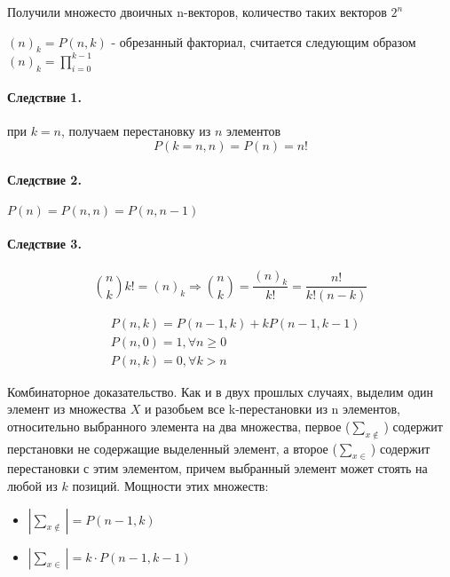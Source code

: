 Получили множесто двоичных n-векторов, количество таких векторов $2^n$

\begin{Def}
${\left(n\right)}_k = P\left(n,k\right)$ - обрезанный факториал, считается следующим образом ${\left(n\right)}_k = \prod_{i=0}^{k-1}$
\end{Def}

\paragraph{Следствие 1.} при $k=n$, получаем перестановку из $n$ элементов
\[
	P\left(k=n,n\right) = P\left(n\right) = n!
\]

\paragraph{Следствие 2.} $P\left(n\right) = P \left(n, n\right) = P\left(n,n-1\right)$

\paragraph{Следствие 3.}
\[
	\binom{n}{k} k! = {\left(n\right)}_k \Rightarrow \binom{n}{k} = \frac{{\left(n\right)}_k}{k!} = \frac{n!}{k!\left(n-k\right)}
\]

\begin{Th}
\[
	\begin{split}
		& P\left(n,k\right) = P\left(n-1,k\right)+k P\left(n-1,k-1\right)\\
		& P\left(n,0\right) = 1, \forall n \ge 0 \\
		& P\left(n,k\right) = 0, \forall k > n
	\end{split}
\]
\end{Th}

\begin{Proof}
Комбинаторное доказательство. Как и в двух прошлых случаях, выделим один элемент из множества $X$ и разобьем все k-перестановки из n элементов, относительно выбранного элемента на два множества, первое ($\sum_{x \notin}$) содержит перстановки не содержащие выделенный элемент, а второе ($\sum_{x \in}$) содержит перестановки с этим элементом, причем выбранный элемент может стоять на любой из $k$ позиций. Мощности этих множеств:
\begin{itemize}
	\item $\left|\sum_{x \not\in}\right| = P\left(n-1,k\right)$

	\item $\left|\sum_{x \in}\right| = k \cdot P\left(n-1, k-1\right)$
\end{itemize}
\end{Proof}

